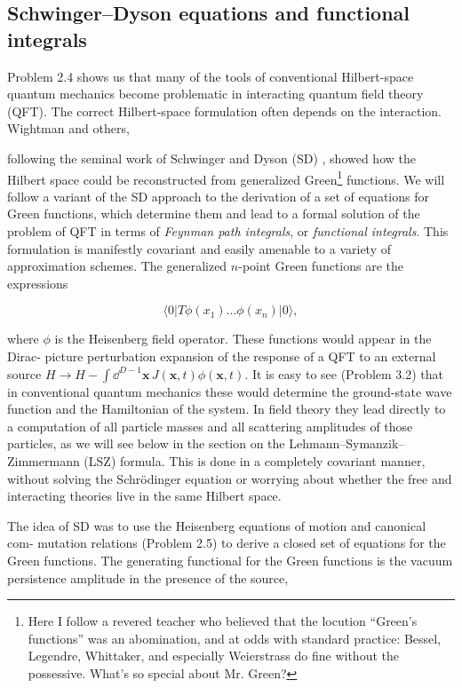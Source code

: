\subsection{Schwinger--Dyson equations and functional integrals}

Problem 2.4 shows us that many of the tools of conventional Hilbert-space quantum
mechanics become problematic in interacting quantum field theory (QFT). The correct
Hilbert-space formulation often depends on the interaction. Wightman and others,

following the seminal work of Schwinger and Dyson (SD) \cite{banks-ref-9,banks-ref-10,banks-ref-11}, showed how the
Hilbert space could be reconstructed from generalized Green\footnote[1]{Here I follow a revered teacher who believed that the locution ``Green's functions'' was an abomination, and at odds with standard practice: Bessel, Legendre, Whittaker, and especially Weierstrass do fine without the possessive. What's so special about Mr. Green?} functions. We will follow a
variant of the SD approach to the derivation of a set of equations for Green functions,
which determine them and lead to a formal solution of the problem of QFT in terms of
\emph{Feynman path integrals}, or \emph{functional integrals}. This formulation is manifestly covariant
and easily amenable to a variety of approximation schemes. The generalized $n$-point Green
functions are the expressions

\[
\langle0|T\phi(x_1)\ldots\phi(x_n)|0\rangle,
\]

where $\phi$ is the Heisenberg field operator. These functions would appear in the Dirac-
picture perturbation expansion of the response of a QFT to an external source $H\to
H-\int\dd^{D-1}\mathbf x\,J(\mathbf x,t)\phi(\mathbf x,t)$. It is easy to see (Problem 3.2) that in conventional quantum
mechanics these would determine the ground-state wave function and the Hamiltonian
of the system. In field theory they lead directly to a computation of all particle masses
and all scattering amplitudes of those particles, as we will see below in the section on
the Lehmann--Symanzik--Zimmermann (LSZ) formula. This is done in a completely
covariant manner, without solving the Schrödinger equation or worrying about whether
the free and interacting theories live in the same Hilbert space.

The idea of SD was to use the Heisenberg equations of motion and canonical com-
mutation relations (Problem 2.5) to derive a closed set of equations for the Green
functions. The generating functional for the Green functions is the vacuum persistence
amplitude in the presence of the source,

